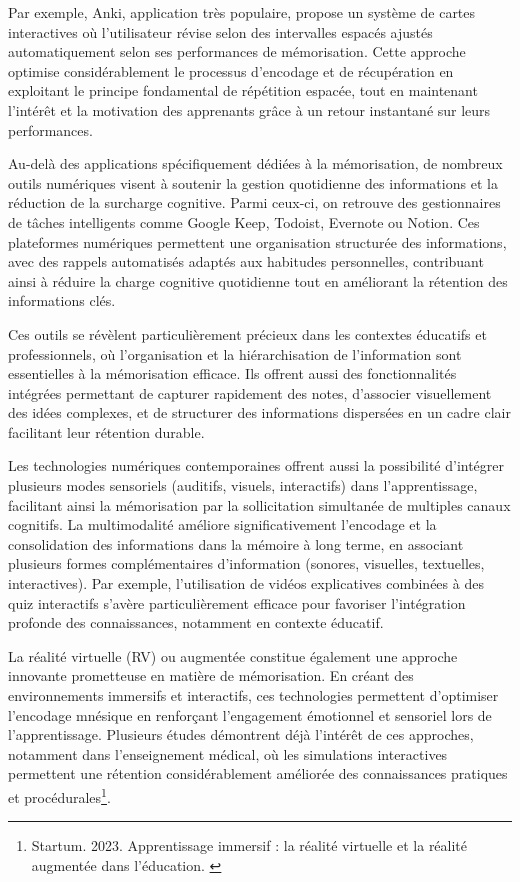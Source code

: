 \documentclass[11pt,a4paper]{report}
\begin{document}
Par exemple, Anki, application très populaire, propose un système de cartes interactives où l’utilisateur révise selon des intervalles espacés ajustés automatiquement selon ses performances de mémorisation. Cette approche optimise considérablement le processus d’encodage et de récupération en exploitant le principe fondamental de répétition espacée, tout en maintenant l'intérêt et la motivation des apprenants grâce à un retour instantané sur leurs performances.

Au-delà des applications spécifiquement dédiées à la mémorisation, de nombreux outils numériques visent à soutenir la gestion quotidienne des informations et la réduction de la surcharge cognitive. Parmi ceux-ci, on retrouve des gestionnaires de tâches intelligents comme Google Keep, Todoist, Evernote ou Notion. Ces plateformes numériques permettent une organisation structurée des informations, avec des rappels automatisés adaptés aux habitudes personnelles, contribuant ainsi à réduire la charge cognitive quotidienne tout en améliorant la rétention des informations clés.

Ces outils se révèlent particulièrement précieux dans les contextes éducatifs et professionnels, où l’organisation et la hiérarchisation de l’information sont essentielles à la mémorisation efficace. Ils offrent aussi des fonctionnalités intégrées permettant de capturer rapidement des notes, d'associer visuellement des idées complexes, et de structurer des informations dispersées en un cadre clair facilitant leur rétention durable.

Les technologies numériques contemporaines offrent aussi la possibilité d’intégrer plusieurs modes sensoriels (auditifs, visuels, interactifs) dans l’apprentissage, facilitant ainsi la mémorisation par la sollicitation simultanée de multiples canaux cognitifs. La multimodalité améliore significativement l’encodage et la consolidation des informations dans la mémoire à long terme, en associant plusieurs formes complémentaires d’information (sonores, visuelles, textuelles, interactives). Par exemple, l'utilisation de vidéos explicatives combinées à des quiz interactifs s’avère particulièrement efficace pour favoriser l’intégration profonde des connaissances, notamment en contexte éducatif.

La réalité virtuelle (RV) ou augmentée constitue également une approche innovante prometteuse en matière de mémorisation. En créant des environnements immersifs et interactifs, ces technologies permettent d'optimiser l'encodage mnésique en renforçant l'engagement émotionnel et sensoriel lors de l’apprentissage. Plusieurs études démontrent déjà l’intérêt de ces approches, notamment dans l’enseignement médical, où les simulations interactives permettent une rétention considérablement améliorée des connaissances pratiques et procédurales\footnote{Startum. 2023. Apprentissage immersif : la réalité virtuelle et la réalité augmentée dans l'éducation. \cite{startum}}.
\end{document}
